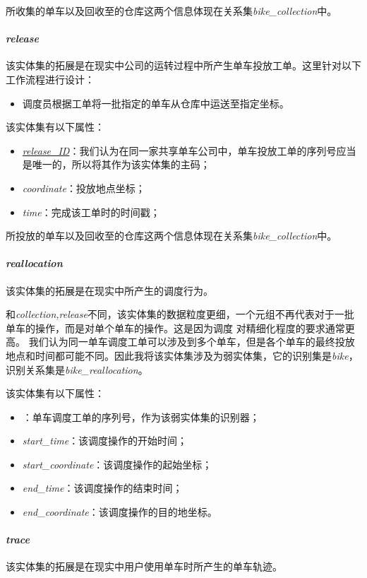 所收集的单车以及回收至的仓库这两个信息体现在关系集\textit{bike\_collection}中。
\paragraph{\textit{release}}
该实体集的拓展是在现实中公司的运转过程中所产生单车投放工单。这里针对以下工作流程进行设计：
\begin{itemize}
\item 调度员根据工单将一批指定的单车从仓库中运送至指定坐标。
\end{itemize}

该实体集有以下属性：
\begin{itemize}
  \item \textit{\underline{release\_ID}}：我们认为在同一家共享单车公司中，单车投放工单的序列号应当是唯一的，所以将其作为该实体集的主码；
  \item \textit{coordinate}：投放地点坐标；
  \item \textit{time}：完成该工单时的时间戳；
\end{itemize}

所投放的单车以及回收至的仓库这两个信息体现在关系集\textit{bike\_collection}中。
\paragraph{\textit{reallocation}}
该实体集的拓展是在现实中所产生的调度行为。

和\textit{collection,release}不同，该实体集的数据粒度更细，一个元组不再代表对于一批单车的操作，而是对单个单车的操作。这是因为调度
对精细化程度的要求通常更高。
我们认为同一单车调度工单可以涉及到多个单车，但是各个单车的最终投放地点和时间都可能不同。因此我将该实体集涉及为弱实体集，它的识别集是\textit{bike}，识别关系集是\textit{bike\_reallocation}。

该实体集有以下属性：
\begin{itemize}
  \item \textit{}：单车调度工单的序列号，作为该弱实体集的识别器；
  \item \textit{start\_time}：该调度操作的开始时间；
  \item \textit{start\_coordinate}：该调度操作的起始坐标；
  \item \textit{end\_time}：该调度操作的结束时间；
  \item \textit{end\_coordinate}：该调度操作的目的地坐标。
\end{itemize}
\paragraph{\textit{trace}}
该实体集的拓展是在现实中用户使用单车时所产生的单车轨迹。

